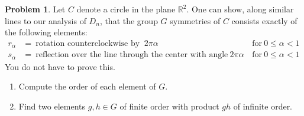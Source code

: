 \documentclass[11pt]{article}
\newcommand{\R}{\mathbb{R}}
\theoremstyle{definition}
\newtheorem{problem}{Problem}
\begin{document}
\begin{problem}
	Let $C$ denote a circle in the plane $\R^2$. One can show, along similar lines to our analysis of $D_n$, that the group $G$ symmetries of $C$ consists exactly of the following elements:
	\[\begin{aligned}  r_\alpha &= \ \text{rotation counterclockwise by } \ 2 \pi \alpha \quad &\text{for} \ 0\leq \alpha <1 \\
s_\alpha &= \ \text{reflection over the line through the center with angle} \ 2 \pi \alpha \qquad &\text{for} \ 0\leq \alpha <1\end{aligned}\]
You do not have to prove this. 
\begin{enumerate}
\item Compute the order of each element of $G$.
\item Find two elements $g,h\in G$ of finite order with product $gh$ of infinite order.
\end{enumerate}
\end{problem}
\end{document}
